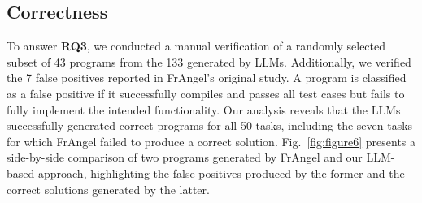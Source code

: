 \subsection{Correctness}
\label{sec:sec44}
To answer \textbf{RQ3}, we conducted a manual verification of a randomly selected subset of 43 programs from the 133 generated by LLMs. Additionally, we verified the 7 false positives reported in FrAngel's original study. A program is classified as a false positive if it successfully compiles and passes all test cases but fails to fully implement the intended functionality. Our analysis reveals that the LLMs successfully generated correct programs for all 50 tasks, including the seven tasks for which FrAngel failed to produce a correct solution. Fig.~\ref{fig:figure6} presents a side-by-side comparison of two programs generated by FrAngel and our LLM-based approach, highlighting the false positives produced by the former and the correct solutions generated by the latter.
